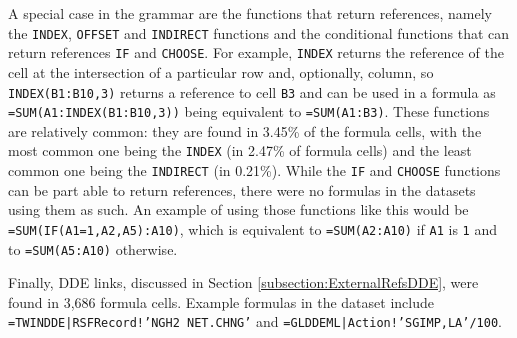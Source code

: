 \documentclass[conference]{IEEEtran}
\begin{document}
A special case in the grammar are the functions that return references, namely the \texttt{INDEX}, \texttt{OFFSET} and  \texttt{INDIRECT} functions and the conditional functions that can return references \texttt{IF} and \texttt{CHOOSE}.
For example, \texttt{INDEX} returns the reference of the cell at the intersection of a particular row and, optionally, column, so \texttt{INDEX(B1:B10,3)} returns a reference to cell \texttt{B3} and can be used in a formula as \texttt{=SUM(A1:INDEX(B1:B10,3))} being equivalent to \texttt{=SUM(A1:B3)}.
These functions are relatively common: they are found in 3.45\% of the formula cells, with the most common one being the \texttt{INDEX} (in 2.47\% of formula cells) and the least common one being the \texttt{INDIRECT} (in 0.21\%).
While the \texttt{IF} and \texttt{CHOOSE} functions can be part able to return references, there were no formulas in the datasets using them as such.
An example of using those functions like this would be \texttt{=SUM(IF(A1=1,A2,A5):A10)}, which is equivalent to \texttt{=SUM(A2:A10)} if \texttt{A1} is \texttt{1} and to \texttt{=SUM(A5:A10)} otherwise.

Finally, DDE links, discussed in Section \ref{subsection:ExternalRefsDDE}, were found in 3,686 formula cells. Example formulas in the dataset include \texttt{=TWINDDE|RSFRecord!'NGH2 NET.CHNG'} and \texttt{=GLDDEML|Action!'SGIMP,LA'/100}.
\end{document}
